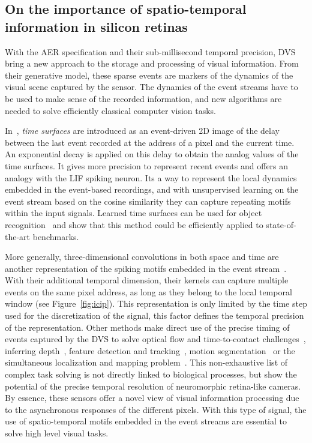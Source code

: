 \documentclass[brainsci, %
               review,submit,pdftex,moreauthors
               ]{Definitions/mdpi}
\begin{document}
\subsection{On the importance of spatio-temporal information in silicon retinas}
%
With the AER specification and their sub-millisecond temporal precision, DVS bring a new approach to the storage and processing of visual information. From their generative model, these sparse events are markers of the dynamics of the visual scene captured by the sensor. The dynamics of the event streams have to be used to make sense of the recorded information, and new algorithms are needed to solve efficiently classical computer vision tasks. 

In~\citep{lagorce_hots_2017}, \textit{time surfaces} are introduced as an event-driven 2D image of the delay between the last event recorded at the address of a pixel and the current time. An exponential decay is applied on this delay to obtain the analog values of the time surfaces. It gives more precision to represent recent events and offers an analogy with the LIF spiking neuron. Its a way to represent the local dynamics embedded in the event-based recordings, and with unsupervised learning on the event stream based on the cosine similarity they can capture repeating motifs within the input signals. Learned time surfaces can be used for object recognition~\citep{lagorce_hots_2017, sironi_hats_2018, maro_event-based_2020, grimaldi_homeostatic_2021,grimaldi_robust_2022} and show that this method could be efficiently applied to state-of-the-art benchmarks.

More generally, three-dimensional convolutions in both space and time are another representation of the spiking motifs embedded in the event stream~\citep{ghosh_spatiotemporal_2019, grimaldi_learning_2022, yu_stsc-snn_2022}. With their additional temporal dimension, their kernels can capture multiple events on the same pixel address, as long as they belong to the local temporal window (see Figure~\ref{fig:icip}). This representation is only limited by the time step used for the discretization of the signal, this factor defines the temporal precision of the representation. Other methods make direct use of the precise timing of events captured by the DVS to solve optical flow and time-to-contact challenges~\citep{benosman_event-based_2014, clady_asynchronous_2014, tschechne_bio-inspired_2014}, inferring depth~\citep{hidalgo-carrio_learning_2020}, feature detection and tracking~\citep{dardelet_event-by-event_2021}, motion segmentation~\citep{stoffregen_event-based_2019} or the simultaneous localization and mapping problem~\citep{kim_real-time_2016}. This non-exhaustive list of complex task solving is not directly linked to biological processes, but show the potential of the precise temporal resolution of neuromorphic retina-like cameras. By essence, these sensors offer a novel view of visual information processing due to the asynchronous responses of the different pixels. With this type of signal, the use of spatio-temporal motifs embedded in the event streams are essential to solve high level visual tasks. 
%
\end{document}
